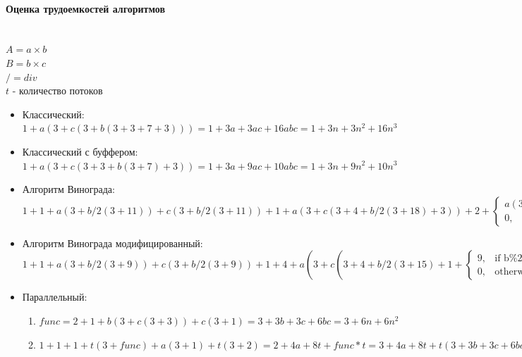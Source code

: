\documentclass[utf8x, 12pt]{G7-32} %
\begin{document}
\paragraph{Оценка трудоемкостей алгоритмов}
\\$A = a\times b$\\$B = b\times c$\\$/ = div$\\$t$ - количество потоков
\begin{itemize}
	\item Классический: $1 + a(3 + c(3 + b(3 + 3 + 7 + 3))) = 1 + 3a + 3ac + 16abc = 1 + 3n + 3n^2 + 16n^3$
	\item Классический с буффером: $1 + a(3 + c(3 + 3 + b(3 + 7) + 3)) = 1 + 3a + 9ac + 10abc = 1 + 3n + 9n^2 + 10n^3$
	\item Алгоритм Винограда: $1 + 1 + a(3 + b/2(3 + 11)) + c(3 + b/2(3 + 11)) + 1 + a(3 + c(3 + 4 + b/2(3 + 18) + 3)) + 2 + \begin{cases} a(3 + c(3 + 3 + 9 + 3)),& \text{if b\%2 != 0}\\0,& \text{otherwise}\end{cases} = 5 + 6a + 3c + 21ab + 10ac + 21bc + 10.5abc + \begin{cases} 3a + 18ac,& \text{if b\%2 != 0}\\0,& \text{otherwise}\end{cases} = 4 + 9n + 54n^2 + 10.5n^3 + \begin{cases} 3n + 18n^2,& \text{if b\%2 != 0}\\0,& \text{otherwise}\end{cases}$
	\item Алгоритм Винограда модифицированный: $1 + 1 + a(3 + b/2(3 + 9)) + c(3 + b/2(3 + 9)) + 1 + 4 + a(3 + c(3 + 4 + b/2(3 + 15) + 1 + \begin{cases} 9,& \text{if b\%2 != 0}\\0,& \text{otherwise}\end{cases} + 3)) = 6 + 6a + 3c + 6ab + 6bc + 9abc + \begin{cases} 20ac,& \text{if b\%2 != 0}\\11ac,& \text{otherwise}\end{cases} + 3bc + 4abc = 6 + 9n + 12n^2 + 9n^3 + \begin{cases} 20n^2,& \text{if b\%2 != 0}\\11n^2,& \text{otherwise}\end{cases}$
	\item Параллельный:
	\begin{enumerate}
		\item $func = 2 + 1 + b(3 + c(3 + 3)) + c(3 + 1) = 3 + 3b + 3c + 6bc = 3 + 6n + 6n^2$
		\item $1 + 1 + 1 + t(3 + func) + a(3 + 1) + t(3 + 2) = 2 + 4a + 8t + func*t = 3 + 4a + 8t + t(3 + 3b + 3c + 6bc) = 3 + 4a + 11t + 3bt + 3ct + 6bct = 3 + 4n + 11t + 3nt + 3nt + 6n^2t$
	\end{enumerate}
\end{itemize}
\end{document}
